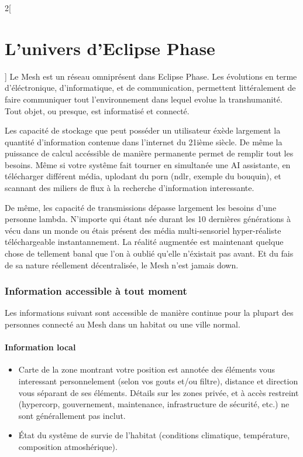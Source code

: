 \documentclass[a4paper,9pt]{article}
\begin{document}
\begin{multicols}{2}[\section{L'univers d'Eclipse Phase}]
Le Mesh est un réseau omniprésent dans Eclipse Phase. Les évolutions en terme
d'éléctronique, d'informatique, et de communication, permettent littéralement de faire
communiquer tout l'environnement dans lequel evolue la transhumanité. Tout objet, ou presque,
est informatisé et connecté.

Les capacité de stockage que peut posséder un utilisateur éxède largement la quantité d'information
contenue dans l'internet du 21ième siècle. De même la puissance de calcul accéssible de manière permanente
permet de remplir tout les besoins. Même si votre systême fait tourner en simultanée une AI assistante, en
télécharger différent média, uplodant du porn (ndlr, exemple du bouquin), et scannant des miliers de flux
à la recherche d'information interessante.

De même, les capacité de transmissions dépasse largement les besoins d'une
personne lambda. N'importe qui étant née durant les 10 dernières générations
à vécu dans un monde ou étais présent des média multi-sensoriel hyper-réaliste
téléchargeable instantannement. La réalité augmentée est maintenant quelque 
chose de tellement banal que l'on à oublié qu'elle n'éxistait pas avant.
Et du fais de sa nature réellement décentralisée,
le Mesh n'est jamais down.

\subsubsection{Information accessible à tout moment}

Les informations suivant sont accessible de manière continue pour la plupart
des personnes connecté au Mesh dans un habitat ou une ville normal.

\paragraph{Information local}
\begin{itemize}
   \item Carte de la zone montrant votre position est annotée des éléments
   vous interessant personnelement (selon vos gouts et/ou filtre), distance
   et direction vous séparant de ses éléments. Détails sur les zones privée,
   et à accès restreint (hypercorp, gouvernement, maintenance, infrastructure de
   sécurité, etc.) ne sont générallement pas inclut.

   \item État du systême de survie de l'habitat (conditions climatique, température,
   composition atmoshérique).


\end{itemize}
\end{multicols}
\end{document}
